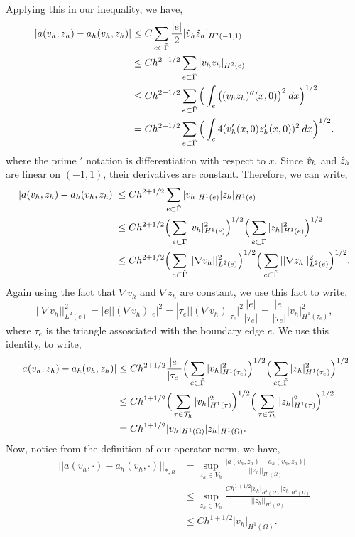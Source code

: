 \documentclass[11pt]{article}
\begin{document}
Applying this in our inequality, we have,
\begin{align*}
    |a(v_h, z_h) - a_h(v_h, z_h)| &\leq C \sum_{e \subset \Tilde{\Gamma}} \frac{|e|}{2} |\Hat{v}_h \Hat{z}_h|_{H^2(-1,1)} \\
	&\leq Ch^{2+1/2} \sum_{e\subset\Tilde{\Gamma}} |v_h z_h|_{H^2(e)} \\ 
	&\leq Ch^{2+1/2} \sum_{e \subset \Tilde{\Gamma}}  \Big( \int_e \big((v_h z_h)''(x,0)\big)^2 \: dx \Big)^{1/2} \\ 
	&= Ch^{2+1/2} \sum_{e \subset \Tilde{\Gamma}} \Big( \int_e 4 (v_h'(x,0) z_h'(x,0))^2 \: dx \Big)^{1/2}.
\end{align*}
where the prime $'$ notation is differentiation with respect to $x$.
Since $\Hat{v}_h$ and $\Hat{z}_h$ are linear on $(-1,1)$, their derivatives are constant.
Therefore, we can write,
\begin{align*}
	|a(v_h, z_h) - a_h(v_h, z_h)| &\leq C h^{2+1/2} \sum_{e\subset\Tilde{\Gamma}} |v_h|_{H^1(e)} |z_h|_{H^1(e)} \\
	&\leq C h^{2+1/2} \Big( \sum_{e\subset\Tilde{\Gamma}} |v_h|^2_{H^1(e)} \Big)^{1/2} \Big( \sum_{e\subset\Tilde{\Gamma}} |z_h|^2_{H^1(e)} \Big)^{1/2} \\
	&\leq C h^{2+1/2} \Big( \sum_{e\subset\Tilde{\Gamma}} ||\nabla v_h||^2_{L^2(e)} \Big)^{1/2} \Big( \sum_{e\subset\Tilde{\Gamma}} ||\nabla z_h||^2_{L^2(e)} \Big)^{1/2}.
\end{align*}
Again using the fact that $\nabla v_h$ and $\nabla z_h$ are constant, we use this fact to write,
\begin{equation}
	||\nabla v_h||^2_{L^2(e)} = |e| \big|(\nabla v_h)|_e\big|^2 = |\tau_e| \big|(\nabla v_h)|_{\tau_e}\big|^2 \frac{|e|}{|\tau_e|} = \frac{|e|}{|\tau_e|} |v_h|^2_{H^1(\tau_e)},
\end{equation}
where $\tau_e$ is the triangle assosciated with the boundary edge $e$.
We use this identity, to write,
\begin{align*}
	|a(v_h, z_h) - a_h(v_h, z_h)| &\leq C h^{2+1/2} \frac{|e|}{|\tau_e|} \Big( \sum_{e\subset\Tilde{\Gamma}} |v_h|^2_{H^1(\tau_e)} \Big)^{1/2} \Big( \sum_{e\subset\Tilde{\Gamma}} |z_h|^2_{H^1(\tau_e)} \Big)^{1/2} \\
	&\leq C h^{1+1/2} \Big( \sum_{\tau \in \mathcal{T}_h} |v_h|^2_{H^1(\tau)} \Big)^{1/2} \Big( \sum_{\tau \in \mathcal{T}_h} |z_h|^2_{H^1(\tau)} \Big)^{1/2} \\
	&= Ch^{1+1/2} |v_h|_{H^1(\Omega)} |z_h|_{H^1(\Omega)}.
\end{align*}
Now, notice from the definition of our operator norm, we have,
\begin{align*}
    ||a(v_h, \cdot) - a_h(v_h, \cdot)||_{*,h} &= \sup_{z_h \in V_h} \frac{|a(v_h, z_h) - a_h(v_h, z_h)|}{||z_h||_{H^1(\Omega)}} \\
	&\leq \sup_{z_h \in V_h} \frac{Ch^{1+1/2}|v_h|_{H^1(\Omega)} |z_h|_{H^1(\Omega)} }{||z_h||_{H^1(\Omega)}} \\
	&\leq Ch^{1+1/2} |v_h|_{H^1(\Omega)}.
\end{align*}
\end{document}
